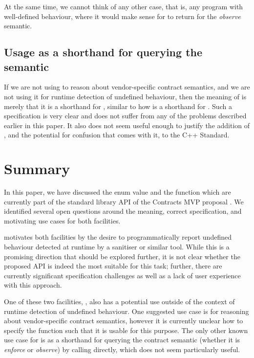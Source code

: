 At the same time, we cannot think of any other case, that is, any program with well-defined behaviour, where it would make sense for  to return  for the \emph{observe} semantic.

\subsection{Usage as a shorthand for querying the semantic}

If we are not using  to reason about vendor-specific contract semantics, and we are not using it for runtime detection of undefined behaviour, then the meaning of  is merely that it is a shorthand for , similar to how  is a shorthand for . Such a specification is very clear and does not suffer from any of the problems described earlier in this paper. It also does not seem useful enough to justify the addition of , and the potential for confusion that comes with it, to the C++ Standard.

\section{Summary}

In this paper, we have discussed the enum value \mbox{} and the function \mbox{} which are currently part of the standard library API of the Contracts MVP proposal \cite{P2900R4}. We identified several open questions around the meaning, correct specification, and motivating use cases for both facilities.

\cite{P2900R4} motivates both facilities by the desire to programmatically report undefined behaviour detected at runtime by a sanitiser or similar tool. While this is a promising direction that should be explored further, it is not clear whether the proposed API is indeed the most suitable for this task; further, there are currently significant specification challenges as well as a lack of user experience with this approach.

One of these two facilities, , also has a potential use outside of the context of runtime detection of undefined behaviour. One suggested use case is for reasoning about vendor-specific contract semantics, however it is currently unclear how to specify the function such that it is usable for this purpose. The only other known use case for  is as a shorthand for querying the contract semantic (whether it is \emph{enforce} or \emph{observe}) by calling  directly, which does not seem particularly useful.

